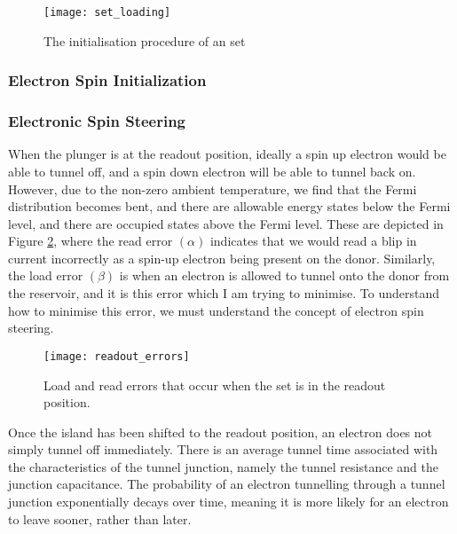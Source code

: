 \begin{figure}[htbp!]
	\centering
	\texttt{[image: set\_loading]}
	\caption[The initiliasation prodedure]{The initialisation procedure of an \gls{set}\cite{morello2010single}}
	\label{fig::set_loading}
\end{figure}

\subsubsection{Electron Spin Initialization}

\subsubsection{Electronic Spin Steering}

When the plunger is at the readout position, ideally a spin up electron would be able to tunnel off, and a spin down electron will be able to tunnel back on. However, due to the non-zero ambient temperature, we find that the Fermi distribution becomes bent, and there are allowable energy states below the Fermi level, and there are occupied states above the Fermi level. These are depicted in Figure \ref{fig::errors}, where the read error $(\alpha)$ indicates that we would read a blip in current incorrectly as a spin-up electron being present on the donor. Similarly, the load error $(\beta)$ is when an electron is allowed to tunnel onto the donor from the reservoir, and it is this error which I am trying to minimise. To understand how to minimise this error, we must understand the concept of electron spin steering.

\begin{figure}[htbp!]
	\centering
	\texttt{[image: readout\_errors]}
	\caption[Load and red errors in the \gls{set} readout position]{Load and read errors that occur when the \gls{set} is in the readout position.\cite{electron_spin_silicon}}
	\label{fig::errors}
\end{figure}


Once the island has been shifted to the readout position, an electron does not simply tunnel off immediately. There is an average tunnel time associated with the characteristics of the tunnel junction, namely the tunnel resistance and the junction capacitance. The probability of an electron tunnelling through a tunnel junction exponentially decays over time, meaning it is more likely for an electron to leave sooner, rather than later. \\


